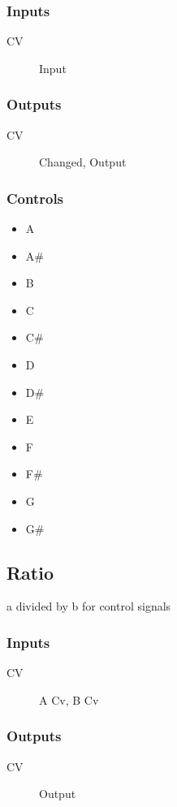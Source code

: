 \subsubsection{Inputs}
\begin{description}
\item [CV] Input
\end{description}

\subsubsection{Outputs}
\begin{description}
\item [CV] Changed, Output
\end{description}

\subsubsection{Controls}
\begin{itemize}
\item A
\item A#
\item B
\item C
\item C#
\item D
\item D#
\item E
\item F
\item F#
\item G
\item G#
\end{itemize}

\subsection{Ratio}

a divided by b for control signals



\subsubsection{Inputs}
\begin{description}
\item [CV] A Cv, B Cv
\end{description}

\subsubsection{Outputs}
\begin{description}
\item [CV] Output
\end{description}

